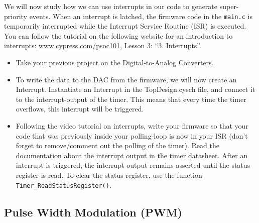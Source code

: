 We will now study how we can use interrupts in our code to generate super-priority events. When an interrupt is latched, the firmware code in the \texttt{main.c} is temporarily interrupted while the Interrupt Service Routine (ISR) is executed. You can follow the tutorial on the following website for an introduction to interrupts: \url{www.cypress.com/psoc101}, Lesson 3: ``3. Interrupts''. 
\begin{itemize}
	\item Take your previous project on the Digital-to-Analog Converters.  
	\item To write the data to the DAC from the firmware, we will now create an Interrupt. Instantiate an Interrupt in the TopDesign.cysch file, and connect it to the interrupt-output of the timer. This means that every time the timer overflows, this interrupt will be triggered. 
	\item Following the video tutorial on interrupts, write your firmware so that your code that was previously inside your polling-loop is now in your ISR (don't forget to remove/comment out the polling of the timer). Read the documentation about the interrupt output in the timer datasheet. After an interrupt is triggered, the interrupt output remains asserted until the status register is read. To clear the status register, use the function \texttt{Timer\_ReadStatusRegister()}. 
\end{itemize}






\newpage
\subsection{Pulse Width Modulation (PWM)}

